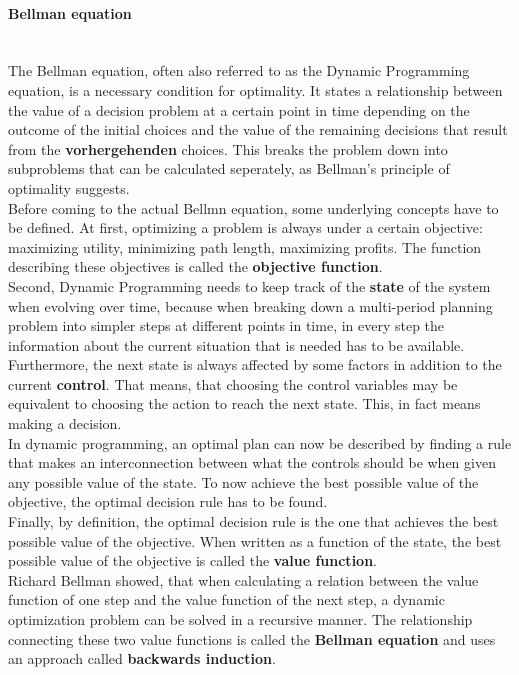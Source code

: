 \documentclass[conference]{IEEEtran}
\begin{document}
\paragraph{Bellman equation}
\quad \\
The Bellman equation, often also referred to as the Dynamic Programming equation, is a necessary condition for optimality.
It states a relationship between the value of a decision problem at a certain point in time depending on the outcome of the initial choices and the value of the remaining decisions that result from the \textbf{vorhergehenden} choices. 
This breaks the problem down into subproblems that can be calculated seperately, as Bellman's principle of optimality suggests.\\
Before coming to the actual Bellmn equation, some underlying concepts have to be defined.
At first, optimizing a problem is always under a certain objective: maximizing utility, minimizing path length, maximizing profits. The function describing these objectives is called the \textbf{objective function}.\\
Second, Dynamic Programming needs to keep track of the \textbf{state} of the system when evolving over time, because when breaking down a multi-period planning problem into simpler steps at different points in time, in every step the information about the current situation that is needed has to be available.\\
Furthermore, the next state is always affected by some factors in addition to the current \textbf{control}. That means, that choosing the control variables may be equivalent to choosing the action to reach the next state. This, in fact means making a decision.\\
In dynamic programming, an optimal plan can now be described by finding a rule that makes an interconnection between what the controls should be when given any possible value of the state. To now achieve the best possible value of the objective, the optimal decision rule has to be found.\\
Finally, by definition, the optimal decision rule is the one that achieves the best possible value of the objective. When written as a function of the state, the best possible value of the objective is called the \textbf{value function}.\\
Richard Bellman showed, that when calculating a relation between the value function of one step and the value function of the next step, a dynamic optimization problem can be solved in a recursive manner. The relationship connecting these two value functions is called the \textbf{Bellman equation} and uses an approach called \textbf{backwards induction}.\\
\end{document}
